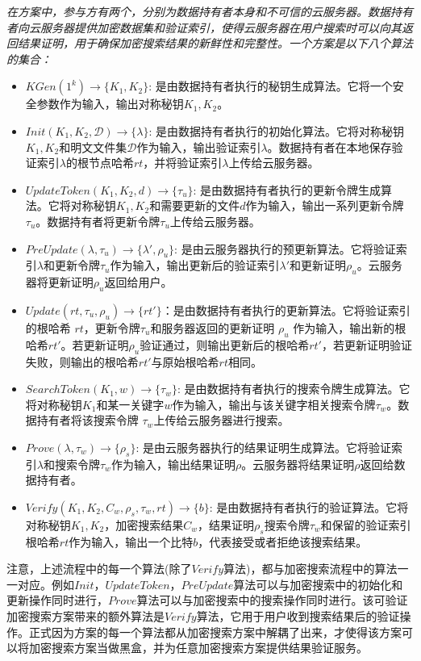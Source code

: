 \begin{definition}\label{def:single}
  {\itshape
      在\single 方案中，参与方有两个，分别为数据持有者本身和不可信的云服务器。数据持有者向云服务器提供加密数据集和验证索引，使得云服务器在用户搜索时可以向其返回结果证明，用于确保加密搜索结果的新鲜性和完整性。一个\single 方案是以下八个算法的集合：
      \begin{itemize}
        \item $KGen(1^k) \rightarrow \{K_1,K_2\}$: 是由数据持有者执行的秘钥生成算法。它将一个安全参数作为输入，输出对称秘钥$K_1,K_2$。
        \item $Init(K_1,K_2, \mathcal{D}) \rightarrow \{\lambda\}$: 是由数据持有者执行的初始化算法。它将对称秘钥$K_1,K_2$和明文文件集$\mathcal{D}$作为输入，输出验证索引$\lambda$。数据持有者在本地保存验证索引$\lambda$的根节点哈希$rt$，并将验证索引$\lambda$上传给云服务器。
        \item $UpdateToken(K_1,K_2, d) \rightarrow \{\tau_u\}$: 是由数据持有者执行的更新令牌生成算法。它将对称秘钥$K_1,K_2$和需要更新的文件$d$作为输入，输出一系列更新令牌$\tau_u$。数据持有者将更新令牌$\tau_u$上传给云服务器。
        \item $PreUpdate(\lambda, \tau_u) \rightarrow \{\lambda',\rho_u\}$: 是由云服务器执行的预更新算法。它将验证索引$\lambda$和更新令牌$\tau_u$作为输入，输出更新后的验证索引$\lambda'$和更新证明$\rho_u$。云服务器将更新证明$\rho_u$返回给用户。
        \item $Update(rt,\tau_u,\rho_u) \rightarrow \{rt'\}$：是由数据持有者执行的更新算法。它将验证索引的根哈希 $rt$，更新令牌$\tau_u$和服务器返回的更新证明 $\rho_u$ 作为输入，输出新的根哈希$rt'$。若更新证明$\rho_u$验证通过，则输出更新后的根哈希$rt'$，若更新证明验证失败，则输出的根哈希$rt'$与原始根哈希$rt$相同。
        \item $SearchToken(K_1, w) \rightarrow \{\tau_{w}\}$: 是由数据持有者执行的搜索令牌生成算法。它将对称秘钥$K_1$和某一关键字$w$作为输入，输出与该关键字相关搜索令牌$\tau_{w}$。数据持有者将该搜索令牌 $\tau_{w}$上传给云服务器进行搜索。
        \item $Prove(\lambda, \tau_{w}) \rightarrow \{\rho_s\}$: 是由云服务器执行的结果证明生成算法。它将验证索引$\lambda$和搜索令牌$\tau_{w}$作为输入，输出结果证明$\rho$。云服务器将结果证明$\rho$返回给数据持有者。
        \item $Verify(K_1,K_2, C_w, \rho_s,\tau_{w}, rt) \rightarrow \{b\}$: 是由数据持有者执行的验证算法。它将对称秘钥$K_1,K_2$，加密搜索结果$C_w$，结果证明$\rho_s$搜索令牌$\tau_{w}$和保留的验证索引根哈希$rt$作为输入，输出一个比特$b$，代表接受或者拒绝该搜索结果。
      \end{itemize}
      }
\end{definition}
注意，上述流程中的每一个算法(除了$Verify$算法)，都与加密搜索流程中的算法一一对应。例如$Init$，$UpdateToken$，$PreUpdate$算法可以与加密搜索中的初始化和更新操作同时进行，$Prove$算法可以与加密搜索中的搜索操作同时进行。该可验证加密搜索方案带来的额外算法是$Verify$算法，它用于用户收到搜索结果后的验证操作。正式因为\single 方案的每一个算法都从加密搜索方案中解耦了出来，才使得该方案可以将加密搜索方案当做黑盒，并为任意加密搜索方案提供结果验证服务。

